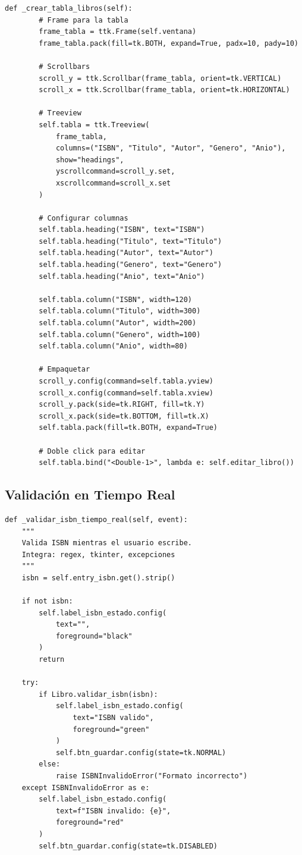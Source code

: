 \documentclass[12pt,a4paper]{article}
\begin{document}
\begin{lstlisting}[caption=Estructura básica de la interfaz]
    def _crear_tabla_libros(self):
        # Frame para la tabla
        frame_tabla = ttk.Frame(self.ventana)
        frame_tabla.pack(fill=tk.BOTH, expand=True, padx=10, pady=10)
        
        # Scrollbars
        scroll_y = ttk.Scrollbar(frame_tabla, orient=tk.VERTICAL)
        scroll_x = ttk.Scrollbar(frame_tabla, orient=tk.HORIZONTAL)
        
        # Treeview
        self.tabla = ttk.Treeview(
            frame_tabla,
            columns=("ISBN", "Titulo", "Autor", "Genero", "Anio"),
            show="headings",
            yscrollcommand=scroll_y.set,
            xscrollcommand=scroll_x.set
        )
        
        # Configurar columnas
        self.tabla.heading("ISBN", text="ISBN")
        self.tabla.heading("Titulo", text="Titulo")
        self.tabla.heading("Autor", text="Autor")
        self.tabla.heading("Genero", text="Genero")
        self.tabla.heading("Anio", text="Anio")
        
        self.tabla.column("ISBN", width=120)
        self.tabla.column("Titulo", width=300)
        self.tabla.column("Autor", width=200)
        self.tabla.column("Genero", width=100)
        self.tabla.column("Anio", width=80)
        
        # Empaquetar
        scroll_y.config(command=self.tabla.yview)
        scroll_x.config(command=self.tabla.xview)
        scroll_y.pack(side=tk.RIGHT, fill=tk.Y)
        scroll_x.pack(side=tk.BOTTOM, fill=tk.X)
        self.tabla.pack(fill=tk.BOTH, expand=True)
        
        # Doble click para editar
        self.tabla.bind("<Double-1>", lambda e: self.editar_libro())
\end{lstlisting}

\subsection{Validación en Tiempo Real}

\begin{lstlisting}[caption=Validación de ISBN en tiempo real]
def _validar_isbn_tiempo_real(self, event):
    """
    Valida ISBN mientras el usuario escribe.
    Integra: regex, tkinter, excepciones
    """
    isbn = self.entry_isbn.get().strip()
    
    if not isbn:
        self.label_isbn_estado.config(
            text="", 
            foreground="black"
        )
        return
    
    try:
        if Libro.validar_isbn(isbn):
            self.label_isbn_estado.config(
                text="ISBN valido", 
                foreground="green"
            )
            self.btn_guardar.config(state=tk.NORMAL)
        else:
            raise ISBNInvalidoError("Formato incorrecto")
    except ISBNInvalidoError as e:
        self.label_isbn_estado.config(
            text=f"ISBN invalido: {e}", 
            foreground="red"
        )
        self.btn_guardar.config(state=tk.DISABLED)
\end{lstlisting}
\end{document}

